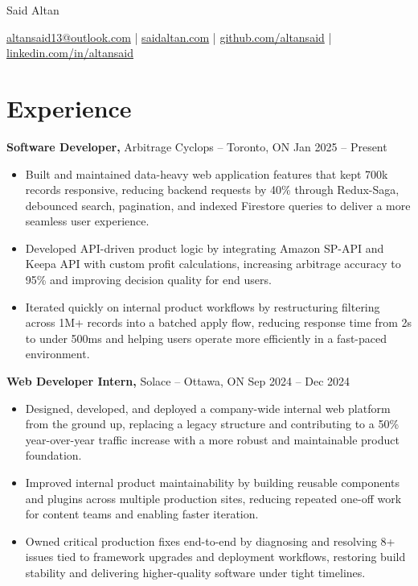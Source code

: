 \documentclass[11pt]{article}       %
\begin{document}
\centerline{\Huge Said Altan}

\vspace{10pt}

\centerline{\href{mailto:altansaid13@outlook.com}{altansaid13@outlook.com} | \href{https://saidaltan.com}{saidaltan.com} | \href{https://github.com/altansaid}{github.com/altansaid} | \href{https://www.linkedin.com/in/altansaid}{linkedin.com/in/altansaid}}


\vspace{5pt}
\section*{Experience}
\textbf{Software Developer,} {Arbitrage Cyclops} -- Toronto, ON \hfill Jan 2025 -- Present \\
\vspace{-9pt}
\begin{itemize}
  \item Built and maintained data-heavy web application features that kept 700k records responsive, reducing backend requests by 40\% through Redux-Saga, debounced search, pagination, and indexed Firestore queries to deliver a more seamless user experience.
  \item Developed API-driven product logic by integrating Amazon SP-API and Keepa API with custom profit calculations, increasing arbitrage accuracy to 95\% and improving decision quality for end users.
  \item Iterated quickly on internal product workflows by restructuring filtering across 1M+ records into a batched apply flow, reducing response time from 2s to under 500ms and helping users operate more efficiently in a fast-paced environment.
\end{itemize}

\textbf{Web Developer Intern,} {Solace} -- Ottawa, ON \hfill Sep 2024 -- Dec 2024 \\
\vspace{-9pt}
\begin{itemize}
  \item Designed, developed, and deployed a company-wide internal web platform from the ground up, replacing a legacy structure and contributing to a 50\% year-over-year traffic increase with a more robust and maintainable product foundation.
  \item Improved internal product maintainability by building reusable components and plugins across multiple production sites, reducing repeated one-off work for content teams and enabling faster iteration.
  \item Owned critical production fixes end-to-end by diagnosing and resolving 8+ issues tied to framework upgrades and deployment workflows, restoring build stability and delivering higher-quality software under tight timelines.
\end{itemize}
\end{document}
